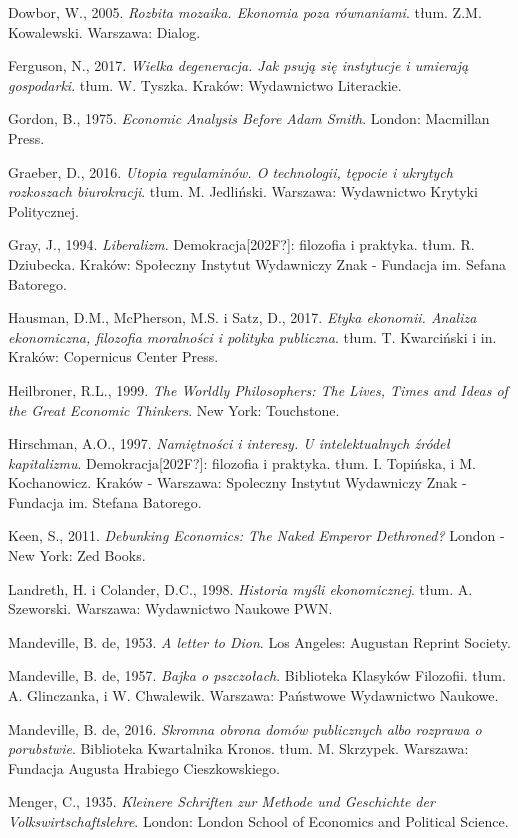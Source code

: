 \documentclass[a4paper]{article}
\begin{document}
Dowbor, W., 2005. \textit{Rozbita mozaika. Ekonomia poza równaniami}. tłum. Z.M. Kowalewski. Warszawa: Dialog.

Ferguson, N., 2017. \textit{Wielka degeneracja. Jak psują się instytucje i umierają gospodarki}. tłum. W. Tyszka. Kraków: Wydawnictwo Literackie.

Gordon, B., 1975. \textit{Economic Analysis Before Adam Smith}. London: Macmillan Press.

Graeber, D., 2016. \textit{Utopia regulaminów. O technologii, tępocie i ukrytych rozkoszach biurokracji}. tłum. M. Jedliński. Warszawa: Wydawnictwo Krytyki Politycznej.

Gray, J., 1994. \textit{Liberalizm}. Demokracja[202F?]: filozofia i praktyka. tłum. R. Dziubecka. Kraków: Społeczny Instytut Wydawniczy Znak - Fundacja im. Sefana Batorego.

Hausman, D.M., McPherson, M.S. i Satz, D., 2017. \textit{Etyka ekonomii. Analiza ekonomiczna, filozofia moralności i polityka publiczna}. tłum. T. Kwarciński i in. Kraków: Copernicus Center Press.

Heilbroner, R.L., 1999. \textit{The Worldly Philosophers: The Lives, Times and Ideas of the Great Economic Thinkers}. New York: Touchstone.

Hirschman, A.O., 1997. \textit{Namiętności i interesy. U intelektualnych źródeł kapitalizmu}. Demokracja[202F?]: filozofia i praktyka. tłum. I. Topińska, i M. Kochanowicz. Kraków - Warszawa: Spoleczny Instytut Wydawniczy Znak - Fundacja im. Stefana Batorego.

Keen, S., 2011. \textit{Debunking Economics: The Naked Emperor Dethroned?} London - New York: Zed Books.

Landreth, H. i Colander, D.C., 1998. \textit{Historia myśli ekonomicznej}. tłum. A. Szeworski. Warszawa: Wydawnictwo Naukowe PWN.

Mandeville, B. de, 1953. \textit{A letter to Dion}. Los Angeles: Augustan Reprint Society.

Mandeville, B. de, 1957. \textit{Bajka o pszczołach}. Biblioteka Klasyków Filozofii. tłum. A. Glinczanka, i W. Chwalewik. Warszawa: Państwowe Wydawnictwo Naukowe.

Mandeville, B. de, 2016. \textit{Skromna obrona domów publicznych albo rozprawa o porubstwie}. Biblioteka Kwartalnika Kronos. tłum. M. Skrzypek. Warszawa: Fundacja Augusta Hrabiego Cieszkowskiego.

Menger, C., 1935. \textit{Kleinere Schriften zur Methode und Geschichte der Volkswirtschaftslehre}. London: London School of Economics and Political Science.
\end{document}
